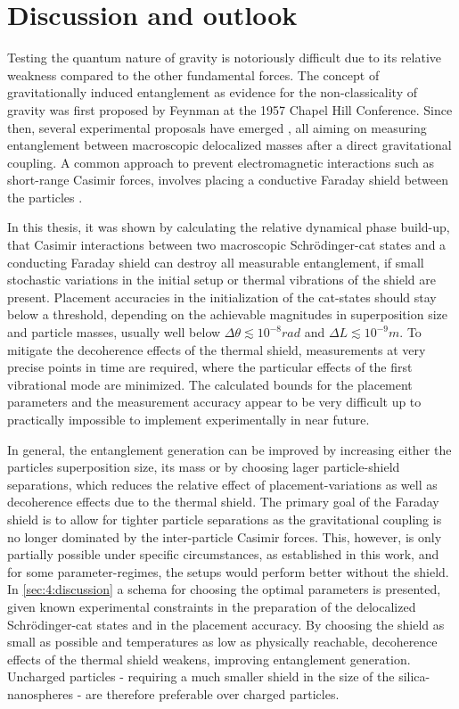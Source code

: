 \chapter{Discussion and outlook}\label{cha:discussion-outlook}
Testing the quantum nature of gravity is notoriously difficult due to its relative weakness compared to the other fundamental forces.
The concept of gravitationally induced entanglement as evidence for the non-classicality of gravity was first proposed by Feynman at the 1957 Chapel Hill Conference.
Since then, several experimental proposals have emerged \cite{Bose_2017,Marletto_2017, Krisnanda_2020}, all aiming on measuring entanglement between macroscopic delocalized masses after a direct gravitational coupling.
A common approach to prevent electromagnetic interactions such as short-range Casimir forces, involves placing a conductive Faraday shield between the particles \cite{Kamp_2020}.

In this thesis, it was shown by calculating the relative dynamical phase build-up, that Casimir interactions between two macroscopic Schrödinger-cat states and a conducting Faraday shield can destroy all measurable entanglement, if small stochastic variations in the initial setup or thermal vibrations of the shield are present.
Placement accuracies in the initialization of the cat-states should stay below a threshold, depending on the achievable magnitudes in superposition size and particle masses, usually well below $\Delta \theta \lesssim 10^{-8}\si{rad}$ and $\Delta L \lesssim 10^{-9}\si{m}$.
To mitigate the decoherence effects of the thermal shield, measurements at very precise points in time are required, where the particular effects of the first vibrational mode are minimized.
The calculated bounds for the placement parameters and the measurement accuracy appear to be very difficult up to practically impossible to implement experimentally in near future.

In general, the entanglement generation can be improved by increasing either the particles superposition size, its mass or by choosing lager particle-shield separations, which reduces the relative effect of placement-variations as well as decoherence effects due to the thermal shield.
The primary goal of the Faraday shield is to allow for tighter particle separations as the gravitational coupling is no longer dominated by the inter-particle Casimir forces.
This, however, is only partially possible under specific circumstances, as established in this work, and for some parameter-regimes, the setups would perform better without the shield.
In \cref{sec:4:discussion} a schema for choosing the optimal parameters is presented, given known experimental constraints in the preparation of the delocalized Schrödinger-cat states and in the placement accuracy.
By choosing the shield as small as possible and temperatures as low as physically reachable, decoherence effects of the thermal shield weakens, improving entanglement generation.
Uncharged particles - requiring a much smaller shield in the size of the silica-nanospheres - are therefore preferable over charged particles.



